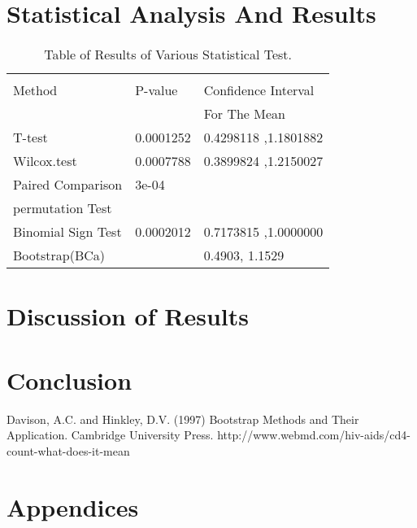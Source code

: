 \documentclass[11pt]{article}
\numberwithin{figure}{section}
\begin{document}
\section{Statistical Analysis And Results}
\begin{table}[h]
\centering
\begin{tabular}{ |l|l|l| }

\multicolumn{2}{c}{} \\
\cline{1-3}
 Method   & P-value & Confidence Interval \\
& &For The Mean \\
\hline
T-test      & 0.0001252    & 0.4298118 ,1.1801882     \\
                 \hline
Wilcox.test       & 0.0007788    & 0.3899824 ,1.2150027      \\
\hline
Paired Comparison      & 3e-04    &       \\
 permutation Test &&\\
\hline
Binomial Sign Test & 0.0002012   &  0.7173815 ,1.0000000     \\
\hline
Bootstrap(BCa) & &0.4903,  1.1529\\
\hline

\end{tabular}
\caption{Table of Results of Various Statistical Test.}
\end{table}
\newpage




\section{Discussion of Results}


\section{Conclusion}






\begin{thebibliography}{100}
	Davison, A.C. and Hinkley, D.V. (1997) Bootstrap Methods and Their Application. Cambridge University Press.
	http://www.webmd.com/hiv-aids/cd4-count-what-does-it-mean

\end{thebibliography}
\newpage
\section{Appendices}
\end{document}
